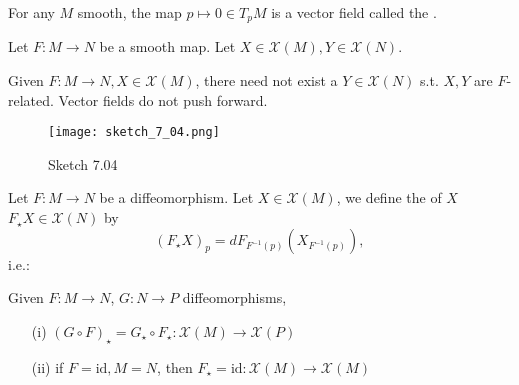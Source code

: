 \begin{example}
    For any \(M\) smooth, the map \(p\mapsto 0\in T_pM\) is a vector field called the .
\end{example}

Let \(F:M \to N\) be a smooth map. Let \(X\in\mathcal{X}(M),Y\in \mathcal{X}(N)\).


 Given \(F:M\to N, X\in\mathcal{X}(M)\), there need not exist a \(Y\in \mathcal{X}(N)\) s.t. 
\(X,Y\) are \(F\)-related. Vector fields do not push forward.
\begin{figure}[H]\label{fig:7.04}
    \centering
    \texttt{[image: sketch\_7\_04.png]}
    \caption{Sketch 7.04}
\end{figure}

\begin{definition*}
    Let \(F:M\to N\) be a diffeomorphism. Let \(X\in\mathcal{X}(M)\), we define 
    the  of \(X\) \(F_\star X\in \mathcal{X}(N)\)
    by \[(F_\star X)_p=dF_{F^{-1}(p)}(X_{F^{-1}(p)}),\]
    i.e.:
    \begin{center}
    \end{center}
\end{definition*}

\begin{lemma}\label{7.2}
    Given \(F:M\to N\), \(G:N\to P\) diffeomorphisms, 
    \begin{enumerate}
        \item[(i)] \((G\circ F)_\star=G_\star\circ F_\star: \mathcal{X}(M)\to \mathcal{X}(P)\)
        \item[(ii)] if \(F=\text{id},M=N\), then \(F_\star=\text{id}:\mathcal{X}(M)\to \mathcal{X}(M)\)  
    \end{enumerate}
\end{lemma}

